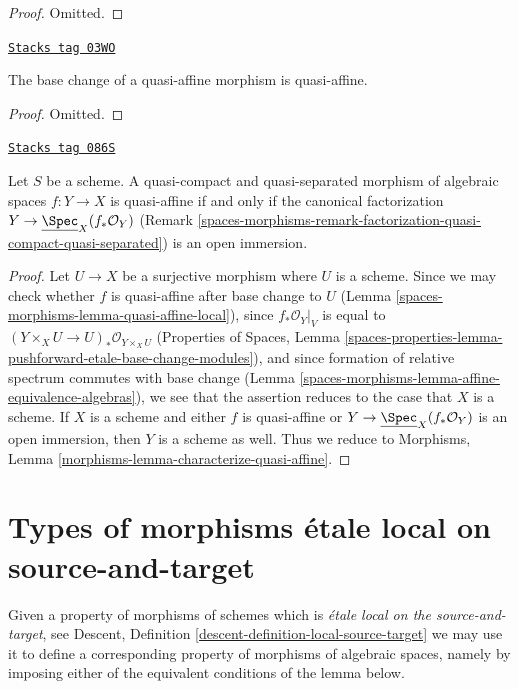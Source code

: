 \begin{proof}
Omitted.
\end{proof}

\begin{lemma}
\label{spaces-morphisms-lemma-base-change-quasi-affine}
\href{https://stacks.math.columbia.edu/tag/03WO}{\texttt{Stacks tag 03WO}}

The base change of a quasi-affine morphism is quasi-affine.
\end{lemma}

\begin{proof}
Omitted.
\end{proof}

\begin{lemma}
\label{spaces-morphisms-lemma-characterize-quasi-affine}
\href{https://stacks.math.columbia.edu/tag/086S}{\texttt{Stacks tag 086S}}

Let $S$ be a scheme.
A quasi-compact and quasi-separated morphism of algebraic spaces
$f : Y \to X$ is quasi-affine if and only if the canonical factorization
$Y \to \underline{\Spec}_X(f_*\mathcal{O}_Y)$
(Remark \ref{spaces-morphisms-remark-factorization-quasi-compact-quasi-separated})
is an open immersion.
\end{lemma}

\begin{proof}
Let $U \to X$ be a surjective morphism where $U$ is a scheme.
Since we may check whether $f$ is quasi-affine after base change to
$U$ (Lemma \ref{spaces-morphisms-lemma-quasi-affine-local}), since $f_*\mathcal{O}_Y|_V$
is equal to $(Y \times_X U \to U)_*\mathcal{O}_{Y \times_X U}$
(Properties of Spaces, Lemma
\ref{spaces-properties-lemma-pushforward-etale-base-change-modules}), and
since formation of relative spectrum commutes with base change
(Lemma \ref{spaces-morphisms-lemma-affine-equivalence-algebras}),
we see that the assertion reduces to the case that $X$ is a scheme.
If $X$ is a scheme and either $f$ is quasi-affine or
$Y \to \underline{\Spec}_X(f_*\mathcal{O}_Y)$ is an open immersion,
then $Y$ is a scheme as well. Thus we reduce to
Morphisms, Lemma \ref{morphisms-lemma-characterize-quasi-affine}.
\end{proof}

\section{Types of morphisms \'etale local on source-and-target}
\label{spaces-morphisms-section-local-source-target}
Given a property of morphisms of schemes which is {\it \'etale local on the
source-and-target}, see
Descent, Definition \ref{descent-definition-local-source-target}
we may use it to define a corresponding
property of morphisms of algebraic spaces, namely by imposing either of
the equivalent conditions of the lemma below.

